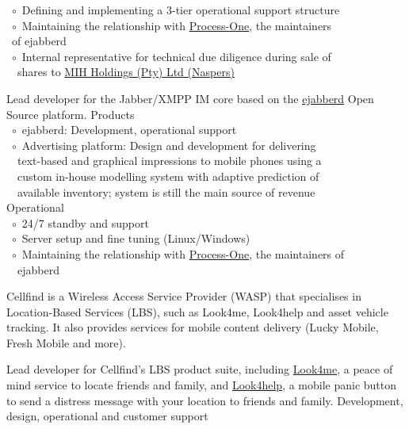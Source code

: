 \documentclass[10pt,a4paper,final]{columncv}
\begin{document}
\begin{cvenv}
{           ~$\circ$~Defining and implementing a 3-tier operational support structure \\
           ~$\circ$~Maintaining the relationship with 
                    \href{http://www.process-one.net/en/}{Process-One}, the maintainers \\ 
           ~\phantom{$\circ$}of ejabberd \\
           ~$\circ$~Internal representative for technical due diligence during sale of \\
           ~\phantom{$\circ$}~shares to \href{http://www.naspers.com/}{MIH Holdings (Pty) Ltd (Naspers)} \\}

         {Lead developer for the Jabber/XMPP IM core based on the 
          \href{http://www.process-one.net/en/ejabberd/}{ejabberd} Open Source platform.}
         {Products \\
          ~$\circ$~ejabberd: Development, operational support \\
          ~$\circ$~Advertising platform: Design and development for delivering \\ 
          ~\phantom{$\circ$}~text-based and graphical impressions to mobile phones using a \\
          ~\phantom{$\circ$}~custom in-house modelling system with adaptive prediction of \\
          ~\phantom{$\circ$}~available inventory; system is still the main source of revenue \\
          Operational \\
          ~$\circ$~24/7 standby and support \\
          ~$\circ$~Server setup and fine tuning (Linux/Windows) \\
          ~$\circ$~Maintaining the relationship with 
                   \href{http://www.process-one.net/en/}{Process-One}, the maintainers of \\ 
          ~\phantom{$\circ$}~ejabberd}
\end{cvenv}

\pagebreak

\noindent Cellfind is a Wireless Access Service Provider (WASP) that specialises in 
Location-Based Services (LBS), such as Look4me, Look4help and asset vehicle tracking. It 
also provides services for mobile content delivery (Lucky Mobile, Fresh Mobile and more). 
\begin{cvenv}
         {Lead developer for Cellfind's LBS product suite, including  
         \href{http://www.look4me.co.za/}{Look4me}, a peace of mind 
         service to locate friends and family, and  
         \href{http://www.look4help.co.za/}{Look4help}, a mobile panic 
         button to send a distress message with your location to friends and family.}
         {Development, design, operational and customer support}
\end{cvenv}
\end{document}
